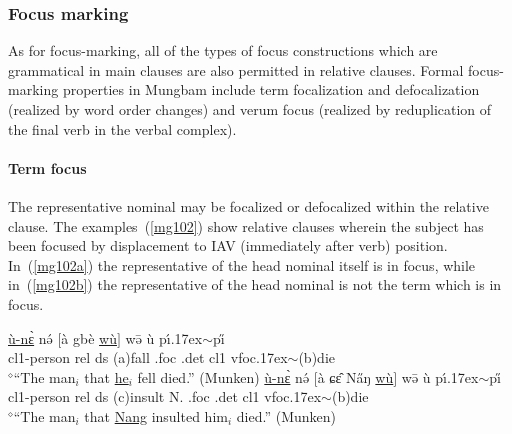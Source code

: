 \documentclass[10pt,twoside]{article}
\makeatletter
\newcommand{\cl}[1]{{\sc cl#1}}
\def\elicited{$^\diamond$}
\def\til{\raise.17ex\hbox{$\scriptstyle\mathtt{\sim}$}}	%
\renewcommand{\i}{ı}
\def\@{ə}
\def\eh{ɛ}
\def\ng{ŋ}
\def\sh{ɕ}
\makeatother
\begin{document}
\subsubsection{Focus marking}\label{secMungbamFocusFocus}
As for focus-marking, all of the types of focus constructions which are 
grammatical in main clauses are
also permitted in relative clauses. 
Formal focus-marking properties
in Mungbam include term focalization and defocalization (realized by
word order changes) and verum focus (realized by reduplication 
of the final verb in the verbal complex). 
%
%

%
\paragraph{Term focus}
The representative nominal may be focalized or defocalized within the relative clause. 
The examples~(\ref{mg102}) show
relative clauses wherein the subject has been focused by displacement
to IAV (immediately after verb) position. In~(\ref{mg102a}) the representative of the head
nominal itself is in focus, while in~(\ref{mg102b}) the representative
of the head nominal is not the term which is in focus.
%
\begin{exe}
\ex	\label{mg102}
\begin{xlist}
\ex \gll \uline{\`u-n\`{\eh}} n\'{\@} $[$\`a gb\`e \uline{w\`u}$]$ w\={\@} \`u p\'\i{\til}p\H{\i}	\\
\cl1-person {\sc rel} {\sc ds} ({\sc a})fall {\sc \cl1.foc} {\sc \cl1.det} \cl1 {\sc vfoc}\til{({\sc b})die}	\\
\glt \elicited``The man$_i$ that \uline{he$_i$} fell died.'' (Munken)	\label{mg102a}
\ex	\gll \uline{\`u-n\`{\eh}} n\'{\@} $[$\`a \sh\^{\eh} N\H{a}{\ng} \uline{w\`u}$]$ w\={\@}  \`u p\'\i{\til}p\H{\i}	\\
\cl1-person {\sc rel} {\sc ds} ({\sc c})insult N. {\sc \cl1.foc} {\sc \cl1.det} \cl1 {\sc vfoc}\til{({\sc b})die}	\\
\glt \elicited``The man$_i$ that \uline{Nang} insulted him$_i$ died.'' (Munken)	\label{mg102b}
\end{xlist}
\end{exe}
%
\end{document}
